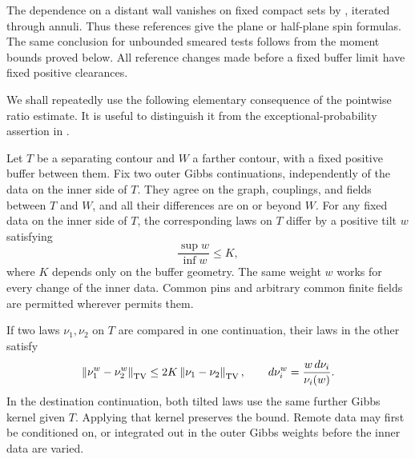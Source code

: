 The dependence on a distant wall vanishes on fixed compact sets by
, iterated through annuli.  Thus these references give
the plane or half-plane spin formulas.  The same conclusion for
unbounded smeared tests follows from the moment bounds proved below.
All reference changes made before a fixed buffer limit have fixed
positive clearances.

We shall repeatedly use the following elementary consequence of the
pointwise ratio estimate.  It is useful to distinguish it from the
exceptional-probability assertion in .

\begin{lemma}
\label{buf:tilt}
Let $T$ be a separating contour and $W$ a farther contour, with a fixed
positive buffer between them.  Fix two outer Gibbs continuations,
independently of the data on the inner side of $T$.  They agree on the graph,
couplings, and fields between $T$ and $W$, and all their differences
are on or beyond $W$.  For any fixed data on the inner side of $T$,
the corresponding laws on $T$ differ by a positive tilt $w$ satisfying
\begin{equation}
 \frac{\sup w}{\inf w}\le K,
 \label{buf:tilt-bound}
\end{equation}
where $K$ depends only on the buffer geometry.  The same weight $w$
works for every change of the inner data.  Common pins and arbitrary
common finite fields are permitted wherever  permits
them.

If two laws $\nu_1,\nu_2$ on $T$ are compared in one continuation,
their laws in the other satisfy
\begin{equation}
 \left\|\nu_1^w-\nu_2^w\right\|_{\operatorname{TV}}
 \le 2K\left\|\nu_1-\nu_2\right\|_{\operatorname{TV}},
 \qquad
 d\nu_i^w=\frac{w\,d\nu_i}{\nu_i(w)}.
 \label{buf:tilt-tv}
\end{equation}
In the destination continuation, both tilted laws use the same further
Gibbs kernel given $T$.  Applying that kernel preserves the bound.
Remote data may first be conditioned on, or integrated out in the outer
Gibbs weights before the inner data are varied.
\end{lemma}

